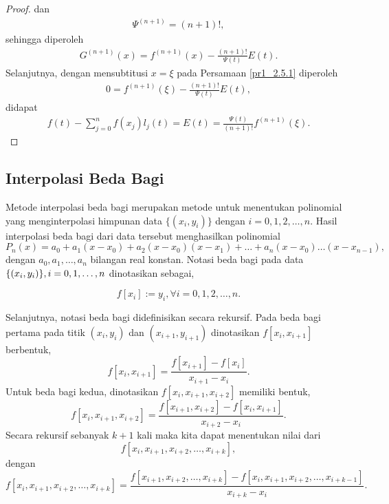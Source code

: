 \begin{proof}
    dan 
    \begin{align*}
        \Psi^{(n+1)} = (n+1)!,
    \end{align*}
    sehingga diperoleh
    \begin{gather}\label{pr1_2.5.1}
        G^{(n+1)}(x) = f^{(n+1)}(x) - \frac{(n+1)!}{\Psi(t)}E(t).
    \end{gather}
    Selanjutnya, dengan mensubtitusi $x=\xi$ pada Persamaan \eqref{pr1_2.5.1} diperoleh
    \begin{gather*}
        0 = f^{(n+1)}(\xi) - \frac{(n+1)!}{\Psi(t)}E(t),
    \end{gather*}
    didapat
    \begin{gather*}
        f(t) - \sum_{j=0}^n f(x_j)l_j(t) = E(t) = \frac{\Psi(t)}{(n+1)!}f^{(n+1)}(\xi).
    \end{gather*}
\end{proof}
\subsection{Interpolasi Beda Bagi}
Metode interpolasi beda bagi merupakan metode untuk menentukan polinomial yang menginterpolasi himpunan data \(\{(x_i,y_i)\}\) dengan \(i=0,1,2,\dots,n\). Hasil interpolasi beda bagi dari data tersebut menghasilkan polinomial
\begin{equation}
	P_n(x) = a_0 + a_1(x-x_0) + a_2(x-x_0)(x-x_1) + \dots + a_n(x-x_0) \dots (x-x_{n-1}),\label{PersBedaBagi}
\end{equation}
dengan $ a_0, a_1, \dots, a_n $ bilangan real konstan. Notasi beda bagi pada data \(\{(x_i,y_i)\},\\ i=0,1,\dots,n\) dinotasikan sebagai,

$$ f[x_i] := y_i , \forall i=0,1,2,\dots,n.$$

Selanjutnya, notasi beda bagi didefinisikan secara rekursif. Pada beda bagi pertama pada titik \((x_i,y_i)\) dan \((x_{i+1},y_{i+1})\) dinotasikan \(f[x_i,x_{i+1}]\) berbentuk,
$$ f[x_i,x_{i+1}] = \frac{f[x_{i+1}] - f[x_i]}{x_{i+1} - x_i} .$$
Untuk beda bagi kedua, dinotasikan \(f[x_i,x_{i+1},x_{i+2}]\) memiliki bentuk,
$$ f[x_i,x_{i+1},x_{i+2}] = \frac{f[x_{i+1},x_{i+2}] - f[x_i,x_{i+1}]}{x_{i+2} - x_i} .$$
Secara rekursif sebanyak \(k+1\) kali maka kita dapat menentukan nilai dari 
\begin{equation*}
    f[x_i,x_{i+1},x_{i+2},\dots,x_{i+k}],
\end{equation*}
dengan 
$$ f[x_i,x_{i+1},x_{i+2},\dots,x_{i+k}] = \frac{f[x_{i+1},x_{i+2},\dots,x_{i+k}] - f[x_i,x_{i+1},x_{i+2},\dots,x_{i+k-1}]}{x_{i+k} - x_i} .$$

